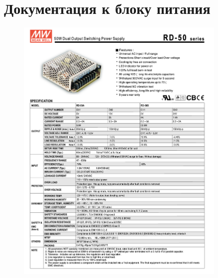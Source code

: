 \documentclass[14pt]{extreport}
\begin{document}
\begin{sloppypar}
\chapter{Документация к блоку питания}
\label{appendbp}
\begin{figure}[ht]
	\centering
	\includegraphics[width=0.9\textwidth]{./images/bp.png}
	\label{fig:bp1}
\end{figure}


\end{sloppypar}
\end{document}
